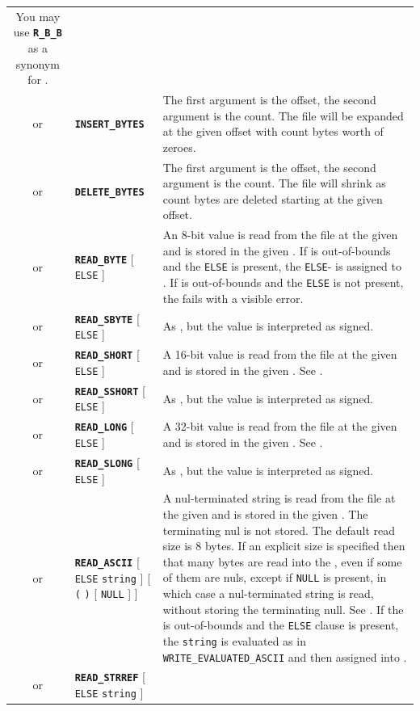 \documentclass{article}
\def\ttref#1{\ahrefloc{#1}{\tt #1}}
\def\DEFINE#1{{\tt \bf #1}\label{#1}\index{#1}}
\def\t#1{{\tt #1}}
\def\Ob{{\color{red} [ }}
\def\Oe{{\color{red} ] }}
\begin{document}
\begin{tabular}{cp{10in}|p{10in}}
  You may use \DEFINE{R_B_B} as a synonym for \ttref{REPLACE_BCS_BLOCK}.
  \\
or & \DEFINE{INSERT_BYTES} \ttref{offset} \ttref{value} &
  The first argument is the offset, the second argument is the count.
  The file will be expanded at the given offset with count bytes worth of
  zeroes. \\
or & \DEFINE{DELETE_BYTES} \ttref{offset} \ttref{value} &
  The first argument is the offset, the second argument is the count.
  The file will shrink as count bytes are deleted starting at the given
  offset. \\
or & \DEFINE{READ_BYTE} \ttref{offset} \ttref{variable} \Ob \t{ELSE}
\ttref{value} \Oe &
  An 8-bit value is read from the file at the given \ttref{offset} and is stored
  in the given \ttref{variable}. If \ttref{offset} is out-of-bounds and the
  \t{ELSE} is present, the \t{ELSE}-\ttref{value} is assigned to
  \ttref{variable}. If \ttref{offset} is out-of-bounds and the \t{ELSE} is
  not present, the \ttref{patch} fails with a visible error.  \\
or & \DEFINE{READ_SBYTE} \ttref{offset} \ttref{variable} \Ob \t{ELSE}
\ttref{value} \Oe &
  As \ttref{READ_BYTE}, but the value is interpreted as signed. \\
or & \DEFINE{READ_SHORT} \ttref{offset} \ttref{variable} \Ob \t{ELSE}
\ttref{value} \Oe &
  A 16-bit value is read from the file at the given \ttref{offset} and is
  stored in the given \ttref{variable}. See \ttref{READ_BYTE}. \\
or & \DEFINE{READ_SSHORT} \ttref{offset} \ttref{variable} \Ob \t{ELSE}
\ttref{value} \Oe &
  As \ttref{READ_SHORT}, but the value is interpreted as signed. \\
or & \DEFINE{READ_LONG} \ttref{offset} \ttref{variable} \Ob \t{ELSE}
\ttref{value} \Oe &
  A 32-bit value is read from the file at the given \ttref{offset}
  and is stored in the given \ttref{variable}. See \ttref{READ_BYTE}. \\
or & \DEFINE{READ_SLONG} \ttref{offset} \ttref{variable} \Ob \t{ELSE}
\ttref{value} \Oe &
  As \ttref{READ_LONG}, but the value is interpreted as signed. \\
or & \DEFINE{READ_ASCII} \ttref{offset} \ttref{variable} \Ob \t{ELSE}
  \t{string} \Oe \Ob \t{(} \ttref{value} \t{)} \Ob \t{NULL} \Oe \Oe &
    A nul-terminated string is read from the file at
    the given \ttref{offset} and is stored in the given \ttref{variable}.
    The terminating nul is not stored. The default read size is 8 bytes.
    If an explicit size \ttref{value} is specified then that many bytes are read
    into the \ttref{variable}, even if some of them are nuls, except if \t{NULL}
    is present, in which case a nul-terminated string is read, without storing
    the terminating null. See
  \ttref{READ_BYTE}.  If the \ttref{offset} is out-of-bounds and the
  \t{ELSE} clause is present, the \t{string} is evaluated as in
  \t{WRITE_EVALUATED_ASCII} and then assigned into \ttref{variable}.
  \\
or & \DEFINE{READ_STRREF} \ttref{offset} \ttref{variable} \Ob \t{ELSE}
\t{string} \Oe &


\end{tabular}
\end{document}
